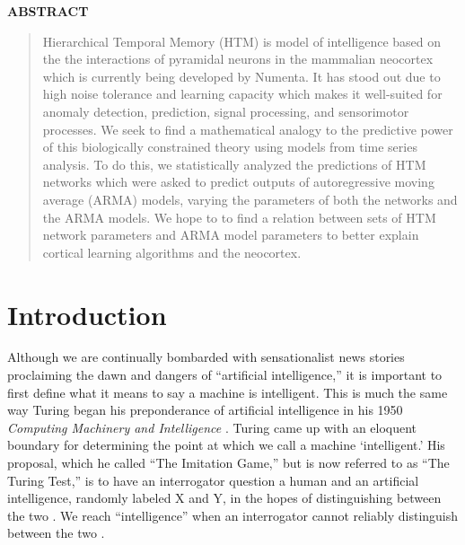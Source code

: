 \documentclass[oneside,12pt,openany]{book}
\begin{document}
	\begin{center}
		\textbf{ABSTRACT}
		
		\begin{quotation}
			\noindent Hierarchical Temporal Memory (HTM) is model of intelligence based on the the interactions of pyramidal neurons in the mammalian neocortex which is currently being developed by Numenta. It has stood out due to high noise tolerance and learning capacity which makes it well-suited for anomaly detection, prediction, signal processing, and sensorimotor processes. We seek to find a mathematical analogy to the predictive power of this biologically constrained theory using models from time series analysis. To do this, we statistically analyzed the predictions of HTM networks which were asked to predict outputs of autoregressive moving average (ARMA) models, varying the parameters of both the networks and the ARMA models. We hope to to find a relation between sets of HTM network parameters and ARMA model parameters to better explain cortical learning algorithms and the neocortex.
		\end{quotation}
		
	\end{center}
	\vfill
	\pagebreak
	\setcounter{tocdepth}{1}
	\listoffigures
	\vfill
	\pagebreak
	
	\listoftables
	\vfill

	\pagebreak
	
	\mainmatter
	\chapter{Introduction}
	
	Although we are continually bombarded with sensationalist news stories proclaiming the dawn and dangers of ``artificial intelligence,'' it is important to first define what it means to say a machine is intelligent. This is much the same way Turing began his preponderance of artificial intelligence in his 1950 \textit{Computing Machinery and Intelligence} \cite{Turing}. Turing came up with an eloquent boundary for determining the point at which we call a machine `intelligent.' His proposal, which he called ``The Imitation Game,'' but is now referred to as ``The Turing Test,'' is to have an interrogator question a human and an artificial intelligence, randomly labeled X and Y, in the hopes of distinguishing between the two \cite{Turing}. We reach ``intelligence'' when an interrogator cannot reliably distinguish between the two \cite{Turing}.
	
\end{document}
